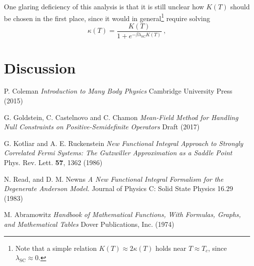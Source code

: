 \documentclass[12pt]{article}
\begin{document}
One glaring deficiency of this analysis is that it is still unclear how $ K(T) $ should be chosen in the first place, since it would in general\footnote{Note that a simple relation $ K(T) \approx 2 \kappa(T) $ holds near $ T \approx T_c $, since $ \lambda_{\text{SC}} \approx 0 $.} require solving
\begin{equation}
\kappa(T) = \frac{K(T)}{1 + e^{- \beta \lambda_{\text{SC}} K(T)}} ~ ,
\label{eq:kappa_temp}
\end{equation}




\section{Discussion}
\label{sec:discussion}

\newpage



\begin{thebibliography}{1}

P. Coleman
\emph{Introduction to Many Body Physics}
Cambridge University Press (2015)

G. Goldstein, C. Castelnovo and C. Chamon
\emph{Mean-Field Method for Handling Null Constraints on Positive-Semidefinite Operators}
Draft (2017)

G. Kotliar and A. E. Ruckenstein
\emph{New Functional Integral Approach to Strongly Correlated Fermi Systems: The Gutzwiller Approximation as a Saddle Point}
Phys. Rev. Lett. \textbf{57}, 1362 (1986)

N. Read, and D. M. Newns
\emph{A New Functional Integral Formalism for the Degenerate Anderson Model.} Journal of Physics C: Solid State Physics 16.29 (1983)

M. Abramowitz
\emph{Handbook of Mathematical Functions, With Formulas, Graphs, and Mathematical Tables}
Dover Publications, Inc. (1974)




\end{thebibliography}
\end{document}
